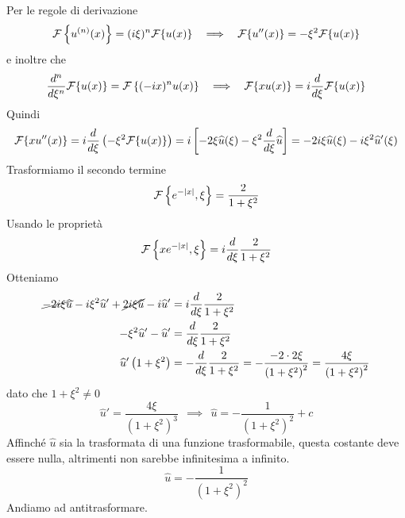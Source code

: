 Per le regole di derivazione
\begin{equation*}
\Fc \left\{u^{(n)}(x)\right\} = (i\xi)^{n}\Fc \{u(x)\} \ \ \implies \ \ \Fc \{u''(x)\} = - \xi ^{2}\Fc \{u(x)\}
\end{equation*}
e inoltre che
\begin{equation*}
\frac{d^{n}}{d\xi ^{n}}\Fc \{u(x)\} = \Fc \left\{(- ix)^{n} u(x)\right\} \ \ \implies \ \ \Fc \{xu(x)\} = i\frac{d}{d\xi }\Fc \{u(x)\}
\end{equation*}
Quindi
\begin{equation*}
\Fc \{xu''(x)\} = i\frac{d}{d\xi }\left(- \xi ^{2}\Fc \{u(x)\}\right) = i\left[ - 2\xi \hat{u}(\xi) - \xi ^{2}\frac{d}{d\xi }\hat{u}\right] = - 2i\xi \hat{u}(\xi) - i\xi ^{2}\hat{u} '(\xi)
\end{equation*}
Trasformiamo il secondo termine
\begin{equation*}
\Fc \left\{e^{ - | x| } ,\xi \right\} = \frac{2}{1 + \xi ^{2}}
\end{equation*}
Usando le proprietà
\begin{equation*}
\Fc \left\{xe^{ - | x| } ,\xi \right\} = i\frac{d}{d\xi }\frac{2}{1 + \xi ^{2}}
\end{equation*}
Otteniamo
\begin{align*}
\cancel{ - 2i\xi \hat{u}} - i\xi ^{2}\hat{u} ' + \cancel{2i\xi \hat{u}} - i\hat{u} ' & = i\frac{d}{d\xi }\frac{2}{1 + \xi ^{2}}\\
- \xi ^{2}\hat{u} ' - \hat{u} ' & = \frac{d}{d\xi }\frac{2}{1 + \xi ^{2}}\\
\hat{u} '\left(1 + \xi ^{2}\right) & = - \frac{d}{d\xi }\frac{2}{1 + \xi ^{2}} = - \frac{ - 2\cdot 2\xi }{\left(1 + \xi ^{2}\right)^{2}} = \frac{4\xi }{\left(1 + \xi ^{2}\right)^{2}}
\end{align*}
dato che $1 + \xi ^{2} \neq 0$
\begin{equation*}
\hat{u} ' = \frac{4\xi }{\left(1 + \xi ^{2}\right)^{3}} \ \ \implies \ \ \hat{u} = - \frac{1}{\left(1 + \xi ^{2}\right)^{2}} + c
\end{equation*}
Affinché $\hat{u}$ sia la trasformata di una funzione trasformabile, questa costante deve essere nulla, altrimenti non sarebbe infinitesima a infinito.
\begin{equation*}
\hat{u} = - \frac{1}{\left(1 + \xi ^{2}\right)^{2}}
\end{equation*}
Andiamo ad antitrasformare.

